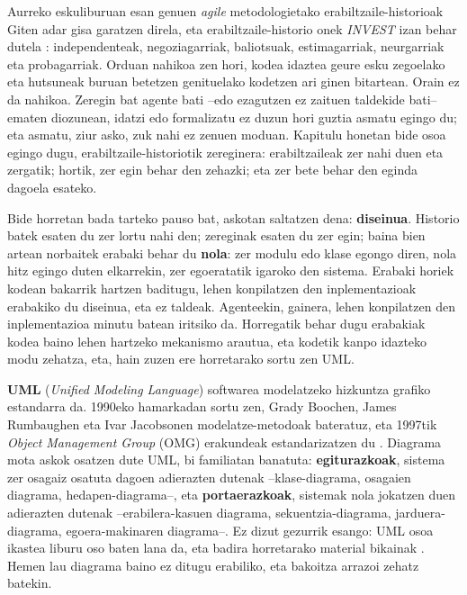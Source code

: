 Aurreko eskuliburuan esan genuen \textit{agile} metodologietako erabiltzaile-historioak Giten adar gisa garatzen direla, eta erabiltzaile-historio onek \textit{INVEST} izan behar dutela \parencite{cohn2004userstories}: independenteak, negoziagarriak, baliotsuak, estimagarriak, neurgarriak eta probagarriak.
Orduan nahikoa zen hori, kodea idaztea geure esku zegoelako eta hutsuneak buruan betetzen genituelako kodetzen ari ginen bitartean.
Orain ez da nahikoa.
Zeregin bat agente bati --edo ezagutzen ez zaituen taldekide bati-- ematen diozunean, idatzi edo formalizatu  ez duzun hori guztia asmatu egingo du; eta asmatu, ziur asko, zuk nahi ez zenuen moduan.
Kapitulu honetan bide osoa egingo dugu, erabiltzaile-historiotik zereginera: erabiltzaileak zer nahi duen eta zergatik; hortik, zer egin behar den zehazki; eta zer bete behar den eginda dagoela esateko.

Bide horretan bada tarteko pauso bat, askotan saltatzen dena: \textbf{diseinua}.
Historio batek esaten du zer lortu nahi den; zereginak esaten du zer egin; baina bien artean norbaitek erabaki behar du \textbf{nola}: zer modulu edo klase egongo diren, nola hitz egingo duten elkarrekin, zer egoeratatik igaroko den sistema.
Erabaki horiek kodean bakarrik hartzen baditugu, lehen konpilatzen den inplementazioak erabakiko du diseinua, eta ez taldeak.
Agenteekin, gainera, lehen konpilatzen den inplementazioa minutu batean iritsiko da.
Horregatik behar dugu erabakiak kodea baino lehen hartzeko mekanismo arautua, eta kodetik kanpo idazteko modu zehatza, eta, hain zuzen ere horretarako sortu zen UML.

\textbf{UML} (\textit{Unified Modeling Language}) softwarea modelatzeko hizkuntza grafiko estandarra da.
1990eko hamarkadan sortu zen, Grady Boochen, James Rumbaughen eta Ivar Jacobsonen modelatze-metodoak bateratuz, eta 1997tik \textit{Object Management Group} (OMG) erakundeak estandarizatzen du \parencite{omg2017uml}.
Diagrama mota askok osatzen dute UML, bi familiatan banatuta: \textbf{egiturazkoak}, sistema zer osagaiz osatuta dagoen adierazten dutenak --klase-diagrama, osagaien diagrama, hedapen-diagrama--,
eta \textbf{portaerazkoak}, sistemak nola jokatzen duen adierazten dutenak --erabilera-kasuen diagrama, sekuentzia-diagrama, jarduera-diagrama, egoera-makinaren diagrama--.
Ez dizut gezurrik esango: UML osoa ikastea liburu oso baten lana da, eta badira horretarako material bikainak \parencite[esaterako,][]{fowler2004uml}.
Hemen lau diagrama baino ez ditugu erabiliko, eta bakoitza arrazoi zehatz batekin.

